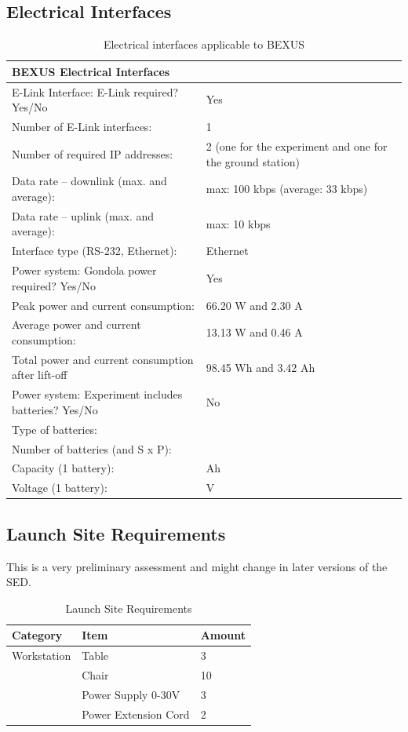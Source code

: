 \subsection{Electrical Interfaces}

\begin{table}[htbp]
\centering
\caption{Electrical interfaces applicable to BEXUS}
\label{tab:electrical_interfaces_bexus}
\begin{tabular}{p{10cm} p{5cm}}
\toprule
\multicolumn{2}{l}{\textbf{BEXUS Electrical Interfaces}} \\
\midrule
E-Link Interface: E-Link required? Yes/No & Yes\\
Number of E-Link interfaces: & 1 \\
Number of required IP addresses: & 2 (one for the experiment and one for the ground station)\\
Data rate -- downlink (max. and average): & max: 100 kbps  (average: 33 kbps) \\
Data rate -- uplink (max. and average): & max: 10 kbps \\
Interface type (RS-232, Ethernet): & Ethernet \\
\midrule
Power system: Gondola power required? Yes/No & Yes\\
Peak power and current consumption: & 66.20 W and 2.30 A \\
Average power and current consumption: & 13.13 W and 0.46 A \\
Total power and current consumption after lift-off & 98.45 Wh and 3.42 Ah \\
\midrule
Power system: Experiment includes batteries? Yes/No & No\\
Type of batteries: & \\
Number of batteries (and S x P): & \\
Capacity (1 battery): & Ah \\
Voltage (1 battery): & V \\
\bottomrule
\end{tabular}
\end{table}
\clearpage

\subsection{Launch Site Requirements}
This is a very preliminary assessment and might change in later versions of the SED.
\begin{table}[htbp]
\centering
\caption{Launch Site Requirements}
\label{tab:launch_site_req}
\begin{tabular}{lll}
\toprule
\textbf{Category} & \textbf{Item} & \textbf{Amount} \\
\midrule
Workstation&Table & 3 \\
 &Chair & 10 \\
 &Power Supply 0-30V & 3\\
 &Power Extension Cord & 2 \\

\bottomrule
\end{tabular}
\end{table}
\clearpage

